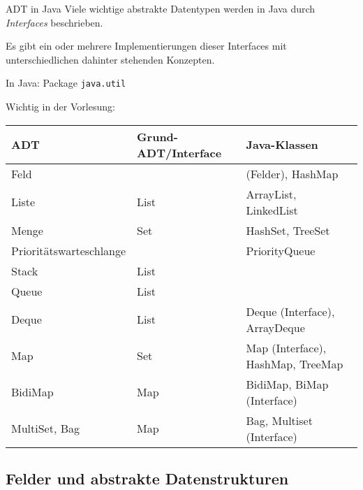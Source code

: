 \documentclass[german]{../spicker}
\begin{document}
\begin{example}{ADT in Java}
    Viele wichtige abstrakte Datentypen werden in Java durch \emph{Interfaces} beschrieben.

    Es gibt ein oder mehrere Implementierungen dieser Interfaces mit unterschiedlichen dahinter stehenden Konzepten.

    In Java: Package \texttt{java.util}

    Wichtig in der Vorlesung:

    \begin{tabular}{l|l|l}
        ADT                     & Grund-ADT/Interface & Java-Klassen                      \\
        \hline
        Feld                    &                     & (Felder), HashMap                 \\
        Liste                   & List                & ArrayList, LinkedList             \\
        Menge                   & Set                 & HashSet, TreeSet                  \\
        Prioritätswarteschlange &                     & PriorityQueue                     \\
        Stack                   & List                &                                   \\
        Queue                   & List                &                                   \\
        Deque                   & List                & Deque (Interface), ArrayDeque     \\
        Map                     & Set                 & Map (Interface), HashMap, TreeMap \\
        BidiMap                 & Map                 & BidiMap, BiMap (Interface)        \\
        MultiSet, Bag           & Map                 & Bag, Multiset (Interface)
    \end{tabular}
\end{example}

\subsection{Felder und abstrakte Datenstrukturen}
\end{document}
